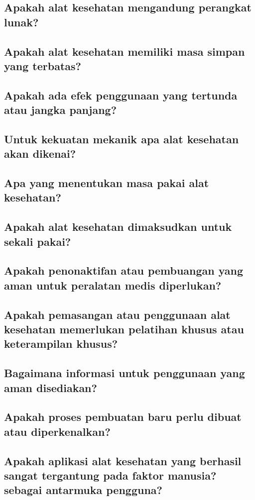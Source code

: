 \documentclass[11pt,a4paper,twoside,draft,onecolumn]{book}
\begin{document}
			\subsection{Apakah alat kesehatan mengandung perangkat lunak?}
			\subsection{Apakah alat kesehatan memiliki masa simpan yang terbatas?}
			\subsection{Apakah ada efek penggunaan yang tertunda atau jangka panjang?}
			\subsection{Untuk kekuatan mekanik apa alat kesehatan akan dikenai?}
			\subsection{ Apa yang menentukan masa pakai alat kesehatan?}
			\subsection{Apakah alat kesehatan dimaksudkan untuk sekali pakai?}
			\subsection{Apakah penonaktifan atau pembuangan yang aman untuk peralatan medis diperlukan?}
			\subsection{Apakah pemasangan atau penggunaan alat kesehatan memerlukan pelatihan khusus atau keterampilan khusus?}
			\subsection{Bagaimana informasi untuk penggunaan yang aman disediakan?}
			\subsection{Apakah proses pembuatan baru perlu dibuat atau diperkenalkan?}
			\subsection{Apakah aplikasi alat kesehatan yang berhasil sangat tergantung pada faktor manusia? sebagai antarmuka pengguna?}
\end{document}
